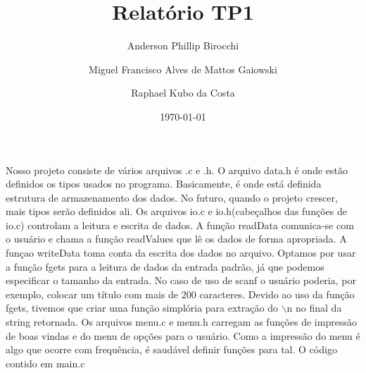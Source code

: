 \documentclass{article}
\title{Relatório TP1}
\author{Anderson Phillip Birocchi \and
  Miguel Francisco Alves de Mattos Gaiowski \and
  Raphael Kubo da Costa}
\date{\today}
\begin{document}
\maketitle

Nosso projeto consiste de vários arquivos .c e .h.
O arquivo data.h é onde estão definidos os tipos usados no programa. Basicamente, é onde está definida estrutura de armazenamento dos dados. No futuro, quando o projeto crescer, mais tipos serão definidos ali.
Os arquivos io.c e io.h(cabeçalhos das funções de io.c) controlam a leitura e escrita de dados. A função readData comunica-se com o usuário e chama a função readValues que lê os dados de forma apropriada. A funçao writeData toma conta da escrita dos dados no arquivo.
Optamos por usar a função fgets para a leitura de dados da entrada padrão, já que podemos especificar o tamanho da entrada. No caso de uso de scanf o usuário poderia, por exemplo, colocar um título com mais de 200 caracteres. Devido ao uso da função fgets, tivemos que criar uma função simplória para extração do $\backslash$n no final da string retornada.
Os arquivos menu.c e menu.h carregam as funções de impressão de boas vindas e do menu de opções para o usuário. Como a impressão do menu é algo que ocorre com frequência, é saudável definir funções para tal.
O código contido em main.c 
\end{document}
